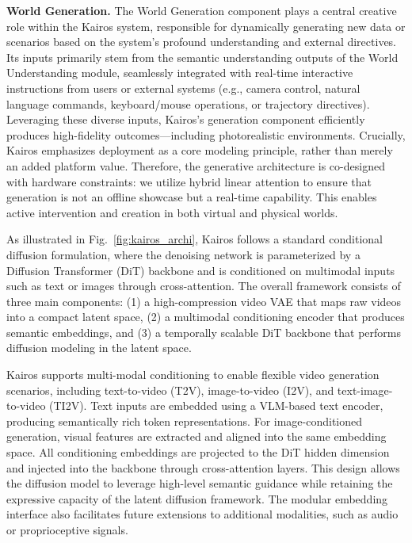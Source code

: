 \textbf{World Generation.} 
The World Generation component plays a central creative role within the Kairos system, responsible for dynamically generating new data or scenarios based on the system's profound understanding and external directives. Its inputs primarily stem from the semantic understanding outputs of the World Understanding module, seamlessly integrated with real-time interactive instructions from users or external systems (e.g., camera control, natural language commands, keyboard/mouse operations, or trajectory directives). Leveraging these diverse inputs, Kairos's generation component efficiently produces high-fidelity outcomes—including photorealistic environments. Crucially, Kairos emphasizes deployment as a core modeling principle, rather than merely an added platform value. Therefore, the generative architecture is co-designed with hardware constraints: we utilize hybrid linear attention to ensure that generation is not an offline showcase but a real-time capability. This enables active intervention and creation in both virtual and physical worlds. 


As illustrated in Fig.~\ref{fig:kairos_archi}, Kairos follows a standard conditional diffusion formulation, where the denoising network is parameterized by a Diffusion Transformer (DiT) backbone and is conditioned on multimodal inputs such as text or images through cross-attention. The overall framework consists of three main components: (1) a high-compression video VAE that maps raw videos into a compact latent space, (2) a multimodal conditioning encoder that produces semantic embeddings, and (3) a temporally scalable DiT backbone that performs diffusion modeling in the latent space.




Kairos supports multi-modal conditioning to enable flexible video generation scenarios, including text-to-video (T2V), image-to-video (I2V), and text-image-to-video (TI2V). Text inputs are embedded using a VLM-based text encoder, producing semantically rich token representations. For image-conditioned generation, visual features are extracted and aligned into the same embedding space. All conditioning embeddings are projected to the DiT hidden dimension and injected into the backbone through cross-attention layers. This design allows the diffusion model to leverage high-level semantic guidance while retaining the expressive capacity of the latent diffusion framework. The modular embedding interface also facilitates future extensions to additional modalities, such as audio or proprioceptive signals.

